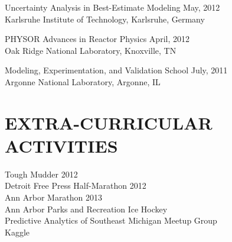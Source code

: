 \documentclass[margin, 10pt]{res} %
\begin{document}
\begin{resume}
Uncertainty Analysis in Best-Estimate Modeling \hfill May, 2012 \\
Karlsruhe Institute of Technology, Karlsruhe, Germany

PHYSOR Advances in Reactor Physics \hfill April, 2012 \\
Oak Ridge National Laboratory, Knoxville, TN

Modeling, Experimentation, and Validation School \hfill July, 2011 \\
Argonne National Laboratory, Argonne, IL


\section{EXTRA-CURRICULAR \\ ACTIVITIES} 

Tough Mudder 2012 \\
Detroit Free Press Half-Marathon 2012 \\
Ann Arbor Marathon 2013 \\
Ann Arbor Parks and Recreation Ice Hockey \\
Predictive Analytics of Southeast Michigan Meetup Group \\
Kaggle 


\end{resume}
\end{document}
